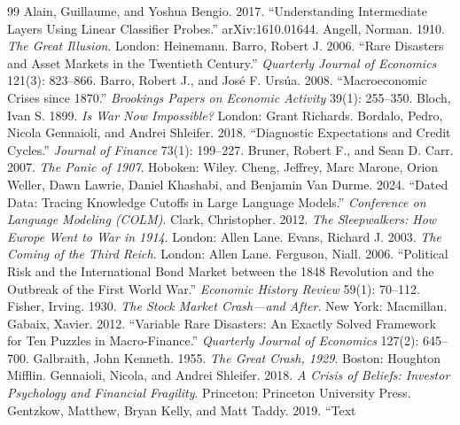 \documentclass[11pt]{article}
\begin{document}
\begin{thebibliography}{99}
 Alain, Guillaume, and Yoshua Bengio. 2017. ``Understanding
Intermediate Layers Using Linear Classifier Probes.'' arXiv:1610.01644.
 Angell, Norman. 1910. \emph{The Great Illusion}. London: Heinemann.
 Barro, Robert J. 2006. ``Rare Disasters and Asset Markets in the Twentieth
Century.'' \emph{Quarterly Journal of Economics} 121(3): 823--866.
 Barro, Robert J., and Jos\'e F. Urs\'ua. 2008.
``Macroeconomic Crises since 1870.'' \emph{Brookings Papers on Economic Activity} 39(1): 255--350.
 Bloch, Ivan S. 1899. \emph{Is War Now Impossible?} London: Grant Richards.
 Bordalo, Pedro, Nicola Gennaioli, and Andrei Shleifer. 2018.
``Diagnostic Expectations and Credit Cycles.'' \emph{Journal of Finance} 73(1): 199--227.
 Bruner, Robert F., and Sean D. Carr. 2007. \emph{The Panic of
1907}. Hoboken: Wiley.
 Cheng, Jeffrey, Marc Marone, Orion Weller, Dawn Lawrie, Daniel
Khashabi, and Benjamin Van Durme. 2024. ``Dated Data: Tracing Knowledge Cutoffs in Large Language
Models.'' \emph{Conference on Language Modeling (COLM)}.
 Clark, Christopher. 2012. \emph{The Sleepwalkers: How Europe Went to War in
1914}. London: Allen Lane.
 Evans, Richard J. 2003. \emph{The Coming of the Third Reich}. London: Allen
Lane.
 Ferguson, Niall. 2006. ``Political Risk and the International Bond
Market between the 1848 Revolution and the Outbreak of the First World War.'' \emph{Economic History Review}
59(1): 70--112.
 Fisher, Irving. 1930. \emph{The Stock Market Crash---and After}. New
York: Macmillan.
 Gabaix, Xavier. 2012. ``Variable Rare Disasters: An Exactly Solved
Framework for Ten Puzzles in Macro-Finance.'' \emph{Quarterly Journal of Economics} 127(2): 645--700.
 Galbraith, John Kenneth. 1955. \emph{The Great Crash, 1929}.
Boston: Houghton Mifflin.
 Gennaioli, Nicola, and Andrei Shleifer. 2018. \emph{A
Crisis of Beliefs: Investor Psychology and Financial Fragility}. Princeton: Princeton University Press.
 Gentzkow, Matthew, Bryan Kelly, and Matt Taddy. 2019. ``Text

\end{thebibliography}
\end{document}

